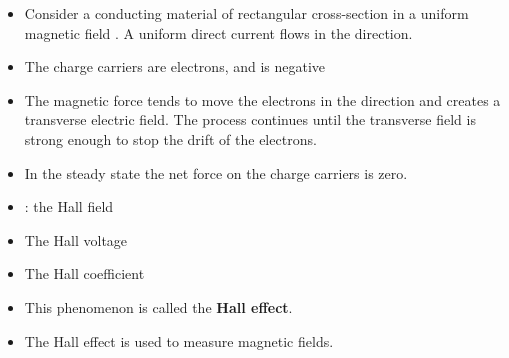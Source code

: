\begin{ELunit}

\begin{itemize}
\tightlist
\item
  Consider a conducting material of rectangular cross-section  in a uniform magnetic field . A uniform direct current flows in the  direction.
\end{itemize}



\begin{itemize}
\tightlist
\item
  The charge carriers are electrons, and  is negative
\end{itemize}


\begin{itemize}
\tightlist
\item
  The magnetic force tends to move the electrons in the  direction and creates a transverse electric field. The process continues until the transverse field is strong enough to stop the drift of the electrons.
\item
  In the steady state the net force on the charge carriers is zero.
\end{itemize}


\begin{itemize}
\tightlist
\item
  : the Hall field
\item
  The Hall voltage
\end{itemize}


\begin{itemize}
\tightlist
\item
  The Hall coefficient
\end{itemize}


\begin{itemize}
\tightlist
\item
  This phenomenon is called the \textbf{Hall effect}.
\item
  The Hall effect is used to measure magnetic fields.
\end{itemize}

\end{ELunit}

